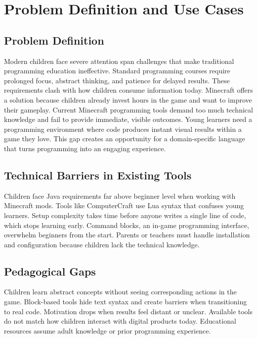 \section{Problem Definition and Use Cases}

\subsection{Problem Definition}

Modern children face severe attention span challenges that make traditional programming education ineffective. 
Standard programming courses require prolonged focus, abstract thinking, and patience for delayed results. 
These requirements clash with how children consume information today. 
Minecraft offers a solution because children already invest hours in the game and want to improve their gameplay. 
Current Minecraft programming tools demand too much technical knowledge and fail to provide immediate, visible outcomes. 
Young learners need a programming environment where code produces instant visual results within a game they love. 
This gap creates an opportunity for a domain-specific language that turns programming into an engaging experience.

\subsection{Technical Barriers in Existing Tools}

Children face Java requirements far above beginner level when working with Minecraft mods. 
Tools like ComputerCraft use Lua syntax that confuses young learners. 
Setup complexity takes time before anyone writes a single line of code, which stops learning early. 
Command blocks, an in-game programming interface, overwhelm beginners from the start. 
Parents or teachers must handle installation and configuration because children lack the technical knowledge.

\subsection{Pedagogical Gaps}

Children learn abstract concepts without seeing corresponding actions in the game. 
Block-based tools hide text syntax and create barriers when transitioning to real code. 
Motivation drops when results feel distant or unclear. 
Available tools do not match how children interact with digital products today. 
Educational resources assume adult knowledge or prior programming experience.

